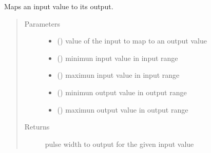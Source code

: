 \documentclass[letterpaper,10pt,english]{sphinxmanual}
\begin{document}
\begin{fulllineitems}
\begin{fulllineitems}
\begin{quote}
\begin{description}
\end{description}\end{quote}

\end{fulllineitems}


\begin{fulllineitems}
\label{\detokenize{base:MultiInputOutputObject.MultiInputOutputObject.map_values}}
\sphinxAtStartPar
Maps an input value to its output.
\begin{quote}\begin{description}
\item[{Parameters}] \leavevmode\begin{itemize}
\item {} 
\sphinxAtStartPar
{} () \textendash{} value of the input to map to an output value

\item {} 
\sphinxAtStartPar
{} () \textendash{} minimun input value in input range

\item {} 
\sphinxAtStartPar
{} () \textendash{} maximun input value in input range

\item {} 
\sphinxAtStartPar
{} () \textendash{} minimun output value in output range

\item {} 
\sphinxAtStartPar
{} () \textendash{} maximun output value in output range

\end{itemize}

\item[{Returns}] \leavevmode
\sphinxAtStartPar
pulse width to output for the given input value


\end{description}
\end{quote}
\end{fulllineitems}
\end{fulllineitems}
\end{document}
